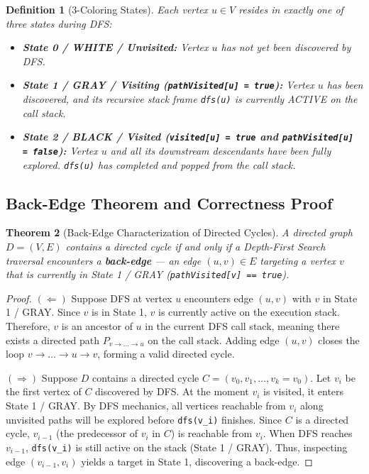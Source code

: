 \documentclass[10pt,journal,compsoc,onecolumn]{IEEEtran}
\newtheorem{theorem}{Theorem}
\newtheorem{definition}[theorem]{Definition}
\begin{document}
\begin{definition}[3-Coloring States]
Each vertex $u \in V$ resides in exactly one of three states during DFS:
\begin{itemize}
    \item \textbf{State 0 / WHITE / Unvisited:} Vertex $u$ has not yet been discovered by DFS.
    \item \textbf{State 1 / GRAY / Visiting (\texttt{pathVisited[u] = true}):} Vertex $u$ has been discovered, and its recursive stack frame \texttt{dfs(u)} is currently ACTIVE on the call stack.
    \item \textbf{State 2 / BLACK / Visited (\texttt{visited[u] = true} and \texttt{pathVisited[u] = false}):} Vertex $u$ and all its downstream descendants have been fully explored. \texttt{dfs(u)} has completed and popped from the call stack.
\end{itemize}
\end{definition}

\subsection{Back-Edge Theorem and Correctness Proof}

\begin{theorem}[Back-Edge Characterization of Directed Cycles]
\label{thm:back_edge}
A directed graph $D = (V, E)$ contains a directed cycle if and only if a Depth-First Search traversal encounters a \textbf{back-edge} --- an edge $(u, v) \in E$ targeting a vertex $v$ that is currently in State 1 / GRAY (\texttt{pathVisited[v] == true}).
\end{theorem}

\begin{proof}
$(\Leftarrow)$ Suppose DFS at vertex $u$ encounters edge $(u, v)$ with $v$ in State 1 / GRAY. Since $v$ is in State 1, $v$ is currently active on the execution stack. Therefore, $v$ is an ancestor of $u$ in the current DFS call stack, meaning there exists a directed path $P_{v \to \dots \to u}$ on the call stack. Adding edge $(u, v)$ closes the loop $v \to \dots \to u \to v$, forming a valid directed cycle.

$(\Rightarrow)$ Suppose $D$ contains a directed cycle $C = (v_0, v_1, \dots, v_k = v_0)$. Let $v_i$ be the first vertex of $C$ discovered by DFS. At the moment $v_i$ is visited, it enters State 1 / GRAY. By DFS mechanics, all vertices reachable from $v_i$ along unvisited paths will be explored before \texttt{dfs(v\_i)} finishes. Since $C$ is a directed cycle, $v_{i-1}$ (the predecessor of $v_i$ in $C$) is reachable from $v_i$. When DFS reaches $v_{i-1}$, \texttt{dfs(v\_i)} is still active on the stack (State 1 / GRAY). Thus, inspecting edge $(v_{i-1}, v_i)$ yields a target in State 1, discovering a back-edge.
\end{proof}
\end{document}
